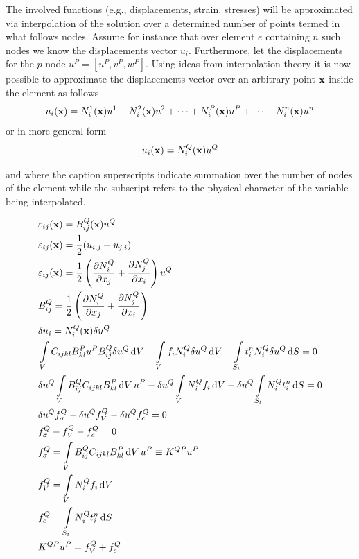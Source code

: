 The involved functions (e.g., displacements, strain, stresses) will be approximated via interpolation of the solution over a determined number of points termed in what follows nodes. Assume for instance that over element $e$ containing $n$ such nodes we know the displacements vector $u_i$. Furthermore, let the displacements for the $p$-node $u^P=[u^P, v^P, w^P]$. Using ideas from interpolation theory it is now possible to approximate the displacements vector over an arbitrary point $\vb{x}$ inside the element as follows
\[u_i(\vb x) = N_i^1(\vb x)u^1 + N_i^2(\vb x)u^2 + \cdots + N_i^P(\vb x)u^P + \cdots + N_i^n(\vb x)u^n\]
or in more general form
\begin{equation} \label{bas_interpol}
{u_i}(\vb x) = N_i^Q(\vb x){u^Q}
\end{equation}

and where the caption superscripts indicate summation over the number of nodes of the element while the subscript refers to the physical character of the variable being interpolated.

\begin{align*}
&\varepsilon_{ij}(\vb x) = B_{ij}^Q(\vb x){u^Q}\\
&\varepsilon_{ij}(\vb x) = \frac{1}{2}( u_{i,j} + u_{j,i} )\\
&\varepsilon_{ij}(\vb x) = \frac{1}{2}\left(\pdv{N_i^Q}{x_j} + \pdv{N_j^Q}{x_i} \right){u^Q}\\
&B_{ij}^Q = \frac{1}{2}\left(\pdv{N_i^Q}{x_j} + \pdv{N_j^Q}{x_i} \right)\\
&\delta {u_i} = N_i^Q(\vb x)\delta {u^Q}\\
&\int\limits_V C_{ijkl} B_{kl}^P u^P B_{ij}^Q\delta u^Q \dd{V} - \int\limits_V f_i N_i^Q\delta {u^Q}\dd{V}  - \int\limits_{S_t} t_i^n N_i^Q\delta {u^Q} \dd{S} = 0\\
&\delta {u^Q}\int\limits_V B_{ij}^Q C_{ijkl} B_{kl}^P\dd{V}{u^P} - \delta {u^Q}\int\limits_V N_i^Q{f_i}\dd{V}  - \delta {u^Q}\int\limits_{S_t} N_i^Qt_i^n\dd{S} = 0 \\
&\delta u^Q f_\sigma ^Q - \delta {u^Q}f_V^Q - \delta u^Q f_c^Q = 0\\
&f_\sigma ^Q - f_V^Q - f_c^Q = 0\\
&f_\sigma ^Q = \int\limits_V B_{ij}^Q C_{ijkl} B_{kl}^P\dd{V} u^P \equiv K^{QP} u^P\\
&f_V^Q = \int\limits_V N_i^Q f_i\dd{V} \\
&f_c^Q = \int\limits_{S_t} N_i^Qt_i^n \dd{S} \\
&K^{QP} u^P = f_V^Q + f_c^Q
\end{align*}

